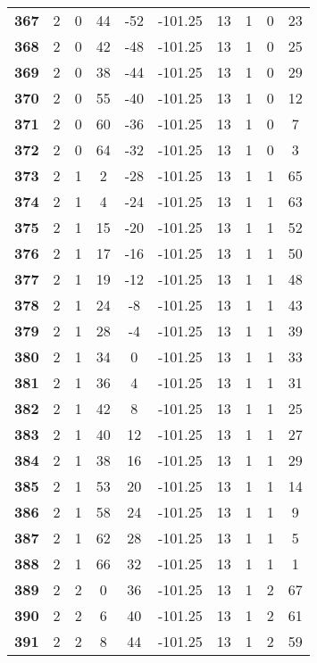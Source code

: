 \documentclass[12pt,letterpaper, onecolumn]{exam}
\begin{document}
\begin{longtable}{cccccccccc}
    \textbf{367} & 2 & 0 & 44 & -52 & -101.25 & 13 & 1 & 0 & 23 \\ 
    \textbf{368} & 2 & 0 & 42 & -48 & -101.25 & 13 & 1 & 0 & 25 \\ 
    \textbf{369} & 2 & 0 & 38 & -44 & -101.25 & 13 & 1 & 0 & 29 \\ 
    \textbf{370} & 2 & 0 & 55 & -40 & -101.25 & 13 & 1 & 0 & 12 \\ 
    \textbf{371} & 2 & 0 & 60 & -36 & -101.25 & 13 & 1 & 0 & 7 \\ 
    \textbf{372} & 2 & 0 & 64 & -32 & -101.25 & 13 & 1 & 0 & 3 \\ 
    \textbf{373} & 2 & 1 & 2 & -28 & -101.25 & 13 & 1 & 1 & 65 \\ 
    \textbf{374} & 2 & 1 & 4 & -24 & -101.25 & 13 & 1 & 1 & 63 \\ 
    \textbf{375} & 2 & 1 & 15 & -20 & -101.25 & 13 & 1 & 1 & 52 \\ 
    \textbf{376} & 2 & 1 & 17 & -16 & -101.25 & 13 & 1 & 1 & 50 \\ 
    \textbf{377} & 2 & 1 & 19 & -12 & -101.25 & 13 & 1 & 1 & 48 \\ 
    \textbf{378} & 2 & 1 & 24 & -8 & -101.25 & 13 & 1 & 1 & 43 \\ 
    \textbf{379} & 2 & 1 & 28 & -4 & -101.25 & 13 & 1 & 1 & 39 \\ 
    \textbf{380} & 2 & 1 & 34 & 0 & -101.25 & 13 & 1 & 1 & 33 \\ 
    \textbf{381} & 2 & 1 & 36 & 4 & -101.25 & 13 & 1 & 1 & 31 \\ 
    \textbf{382} & 2 & 1 & 42 & 8 & -101.25 & 13 & 1 & 1 & 25 \\ 
    \textbf{383} & 2 & 1 & 40 & 12 & -101.25 & 13 & 1 & 1 & 27 \\ 
    \textbf{384} & 2 & 1 & 38 & 16 & -101.25 & 13 & 1 & 1 & 29 \\ 
    \textbf{385} & 2 & 1 & 53 & 20 & -101.25 & 13 & 1 & 1 & 14 \\ 
    \textbf{386} & 2 & 1 & 58 & 24 & -101.25 & 13 & 1 & 1 & 9 \\ 
    \textbf{387} & 2 & 1 & 62 & 28 & -101.25 & 13 & 1 & 1 & 5 \\ 
    \textbf{388} & 2 & 1 & 66 & 32 & -101.25 & 13 & 1 & 1 & 1 \\ 
    \textbf{389} & 2 & 2 & 0 & 36 & -101.25 & 13 & 1 & 2 & 67 \\ 
    \textbf{390} & 2 & 2 & 6 & 40 & -101.25 & 13 & 1 & 2 & 61 \\ 
    \textbf{391} & 2 & 2 & 8 & 44 & -101.25 & 13 & 1 & 2 & 59 \\ 

\end{longtable}
\end{document}

